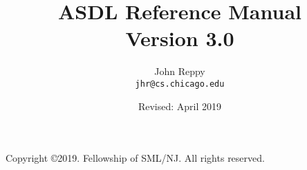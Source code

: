 \documentclass[11pt,letterpaper]{book}
\title{
  ASDL Reference Manual \\
  Version 3.0}
\author{
  John Reppy\\
  \texttt{jhr@cs.chicago.edu}}
\date{Revised: April 2019}
\begin{document}
\frontmatter

\maketitle

\phantom{.}

\noindent Copyright \copyright{}2019.  Fellowship of SML/NJ.  All rights reserved.

\vskip 12pt

\pagebreak

\tableofcontents

\mainmatter


\newpage


%
%




%



\backmatter



\end{document}
